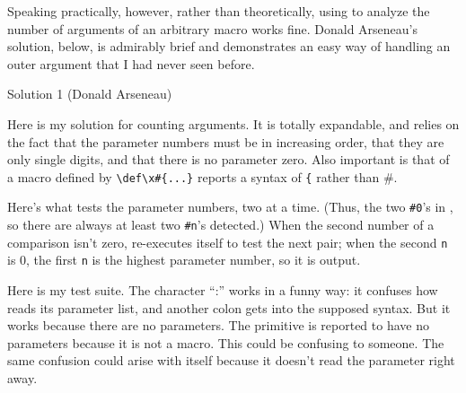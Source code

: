 Speaking practically, however, rather than theoretically, using
\cmd{\meaning} to analyze the number of arguments of an arbitrary macro
works fine. Donald Arseneau's solution, below, is admirably
brief and demonstrates an easy way of handling an outer argument
that I had never seen before.

\begin{solution}{Solution 1 (Donald Arseneau)}

Here is my solution for counting arguments. It is totally expandable,
and relies on the fact that the parameter numbers must be in
increasing order, that they are only single digits, and that there is
no parameter zero. Also important is that \cmd{\meaning} of a macro defined
by \verb?\def\x#{...}? reports a syntax of \verb?{? rather than \#.
\begin{lcode}
{\catcode` \catcode`\#=12 %
%
\gdef\args{\expandafter\Args\noexpand}%
%
\long\gdef\Args*1{\expandafter\countargs \meaning*1:->{}\end}%
%
\gdef\countargs*1:*2->*3\end{\twoargs#0*2#0}%
\end{lcode}

 Here's what tests the parameter numbers, two at a time. (Thus, the two
 \verb?#0?'s in \cmd{\countargs}, so there are always at least two 
\verb?#n?'s detected.)
 When the second number of a comparison isn't zero, \cmd{\twoargs} re-executes
 itself to test the next pair; when the second \verb?n? is 0, the first 
\verb?n? is the
 highest parameter number, so it is output.
\begin{lcode}
\gdef\twoargs*1#*2*3#*4{\ifnum0=*4 *2\else %
  \expandafter\twoargs\expandafter#\expandafter*4\fi}
}
\end{lcode}

Here is my test suite.  The character ``:'' works in a funny way: it
confuses how \cmd{\countargs} reads its parameter list, and another colon
gets into the supposed syntax.  But it works because there are no
parameters. The primitive \cmd{\halign} is reported to have no parameters
because it is not a macro.  This could be confusing to someone. The
same confusion could arise with \cmd{\args} itself because it doesn't read
the parameter right away.
\begin{lcode}
\def\test#1#{nothing}
\def\Test[#1]#2:{\##1,#2##}
\def\#{haha}


\end{lcode}
\end{solution}
